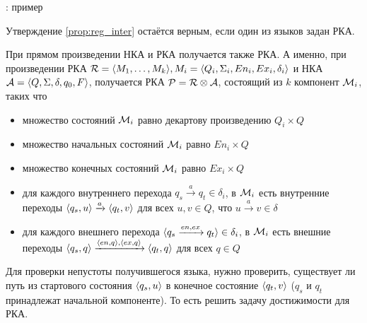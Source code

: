\TODO: пример

\begin{proposition}\cite{Alur05}
  Утверждение \ref{prop:reg_inter} остаётся верным, если один из языков задан РКА. 
\end{proposition}

При прямом произведении НКА и РКА получается также РКА. А именно, при произведении РКА $\mathcal{R} = \langle M_1, \dots, M_k \rangle,  M_i = \langle Q_i, \Sigma_i, En_i, Ex_i, \delta_i \rangle$ и НКА $\mathcal{A} = \langle Q, \Sigma, \delta, q_0, F \rangle$, получается РКА $\mathcal{P} = \mathcal{R} \otimes \mathcal{A}$, состоящий из $k$ компонент $\mathcal{M}_i$, таких что
  \vspace{-\topsep}
  \begin{itemize}
    \setlength\itemsep{-0.1em}
    \item множество состояний $\mathcal{M}_i$ равно декартову произведению $Q_i \times Q$
    \item множество начальных состояний $\mathcal{M}_i$ равно $En_i \times Q$
    \item множество конечных  состояний $\mathcal{M}_i$ равно $Ex_i \times Q$
    \item для каждого внутреннего перехода $q_s \xrightarrow{a} q_t \in \delta_i$, в $\mathcal{M}_i$ есть внутренние переходы $\langle q_s, u \rangle \xrightarrow{a} \langle q_t, v \rangle$ для всех $u, v \in Q$, что $u \xrightarrow{a} v \in \delta$
    \item для каждого внешнего перехода $\langle q_s \xrightarrow{en, ex} q_t \rangle \in \delta_i$, в $\mathcal{M}_i$ есть внешние переходы $\langle q_s, q \rangle \xrightarrow{\langle en, q \rangle, \langle ex, q \rangle} \langle q_t, q \rangle$ для всех $q \in Q$
  \end{itemize}



    




Для проверки непустоты получившегося языка, нужно проверить, существует ли путь из стартового состояния $\langle q_s, u \rangle$ в конечное состояние $\langle q_t, v \rangle$ ($q_s$ и $q_t$ принадлежат начальной компоненте). То есть решить задачу достижимости для РКА.

